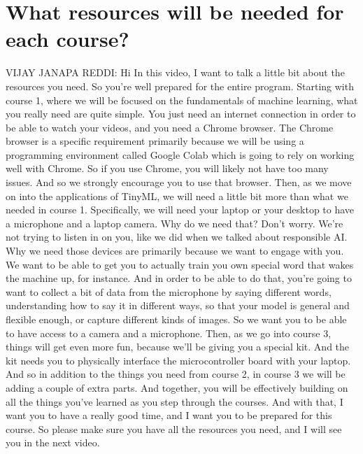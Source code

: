 

\section{What resources will be needed for each course?}

VIJAY JANAPA REDDI: Hi In this video, I want
to talk a little bit about the resources you need.
So you're well prepared for the entire program.
Starting with course 1, where we will be focused
on the fundamentals of machine learning, what you really need are quite simple.
You just need an internet connection in order to be able to watch your videos,
and you need a Chrome browser.
The Chrome browser is a specific requirement primarily because we will
be using a programming environment called Google Colab which is going
to rely on working well with Chrome.
So if you use Chrome, you will likely not have too many issues.
And so we strongly encourage you to use that browser.
Then, as we move on into the applications of TinyML,
we will need a little bit more than what we needed in course 1.
Specifically, we will need your laptop or your desktop
to have a microphone and a laptop camera.
Why do we need that?
Don't worry.
We're not trying to listen in on you, like we did
when we talked about responsible AI.
Why we need those devices are primarily because we want to engage with you.
We want to be able to get you to actually train
you own special word that wakes the machine up, for instance.
And in order to be able to do that, you're
going to want to collect a bit of data from the microphone
by saying different words, understanding how to say it in different ways,
so that your model is general and flexible enough,
or capture different kinds of images.
So we want you to be able to have access to a camera and a microphone.
Then, as we go into course 3, things will get even more fun,
because we'll be giving you a special kit.
And the kit needs you to physically interface the microcontroller
board with your laptop.
And so in addition to the things you need from course 2,
in course 3 we will be adding a couple of extra parts.
And together, you will be effectively building
on all the things you've learned as you step through the courses.
And with that, I want you to have a really good time,
and I want you to be prepared for this course.
So please make sure you have all the resources you need,
and I will see you in the next video.

